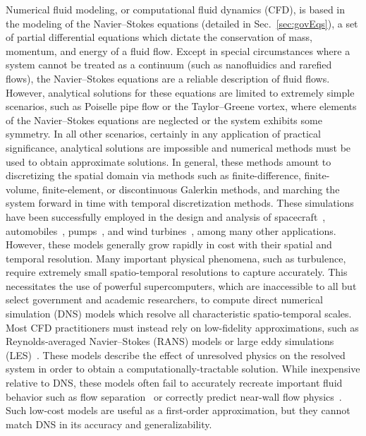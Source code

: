 Numerical fluid modeling, or computational fluid dynamics (CFD), is based in the modeling of the Navier--Stokes equations (detailed in Sec.~\ref{sec:govEqs}), a set of partial differential equations which dictate the conservation of mass, momentum, and energy of a fluid flow. Except in special circumstances where a system cannot be treated as a continuum (such as nanofluidics and rarefied flows), the Navier--Stokes equations are a reliable description of fluid flows. However, analytical solutions for these equations are limited to extremely simple scenarios, such as Poiselle pipe flow or the Taylor--Greene vortex, where elements of the Navier--Stokes equations are neglected or the system exhibits some symmetry. In all other scenarios, certainly in any application of practical significance, analytical solutions are impossible and numerical methods must be used to obtain approximate solutions. In general, these methods amount to discretizing the spatial domain via methods such as finite-difference, finite-volume, finite-element, or discontinuous Galerkin methods, and marching the system forward in time with temporal discretization methods. These simulations have been successfully employed in the design and analysis of spacecraft~\cite{Murman2005}, automobiles~\cite{Kobayashi1992}, pumps~\cite{Shah2013}, and wind turbines~\cite{Sumner2010}, among many other applications. However, these models generally grow rapidly in cost with their spatial and temporal resolution. Many important physical phenomena, such as turbulence, require extremely small spatio-temporal resolutions to capture accurately. This necessitates the use of powerful supercomputers, which are inaccessible to all but select government and academic researchers, to compute direct numerical simulation (DNS) models which resolve all characteristic spatio-temporal scales. Most CFD practitioners must instead rely on low-fidelity approximations, such as Reynolds-averaged Navier--Stokes (RANS) models or large eddy simulations (LES)~\cite{Alfonsi2009,Mason1994}. These models describe the effect of unresolved physics on the resolved system in order to obtain a computationally-tractable solution. While inexpensive relative to DNS, these models often fail to accurately recreate important fluid behavior such as flow separation~\cite{Catalano2003} or correctly predict near-wall flow physics~\cite{Nicoud2011}. Such low-cost models are useful as a first-order approximation, but they cannot match DNS in its accuracy and generalizability.

